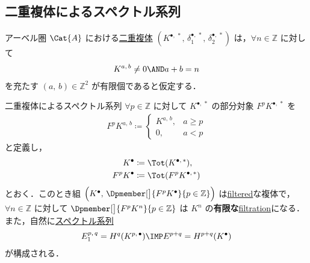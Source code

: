 \documentclass[algtopo_main]{subfiles}
\begin{document}
\subsection{二重複体によるスペクトル系列}

アーベル圏 $\Cat{A}$ における\hyperref[def:double-complex]{二重複体} $(K^{\bullet,\, *},\, \delta_1^{\bullet,\, *},\, \delta_2^{\bullet,\, *})$ は，$\forall n \in \mathbb{Z}$ に対して
\begin{align}
    K^{a,\, b} \neq 0 \AND a+b = n
\end{align}
を充たす $(a,\, b) \in \mathbb{Z}^2$ が有限個であると仮定する．

\begin{mytheo}[label=SS:double-complex, breakable]{二重複体によるスペクトル系列}
    $\forall p \in \mathbb{Z}$ に対して $K^{\bullet,\, *}$ の部分対象 $F^p K^{\bullet,\, *}$ を
    \begin{align}
        F^p K^{a,\, b} \coloneqq
        \begin{cases}
            K^{a,\, b}, & a \ge p \\
            0, & a < p
        \end{cases}
    \end{align}
    と定義し，
    \begin{align}
        K^\bullet &\coloneqq \Tot (K^{\bullet,\, *}), \\
        F^p K^\bullet &\coloneqq \Tot (F^p K^{\bullet,\, *})
    \end{align}
    とおく．このとき組 $\Bigl( K^\bullet,\, \Dpmember[\big]{F^pK^\bullet}{p \in \mathbb{Z}} \Bigr)$ は\hyperref[def:filtration]{filtered}な複体で，
    $\forall n \in \mathbb{Z}$ に対して $ \Dpmember[\big]{F^pK^n}{p \in \mathbb{Z}}$ は $K^n$ の\textbf{有限な}\hyperref[def:filtration]{filtration}になる．
    また，自然に\hyperref[def:SSQ]{スペクトル系列}
    \begin{align}
        E_1^{p,\, q} = H^q(K^{p,\, \bullet}) \IMP E^{p+q} = H^{p+q} (K^\bullet)
    \end{align}
    が構成される．
\end{mytheo}
\end{document}
